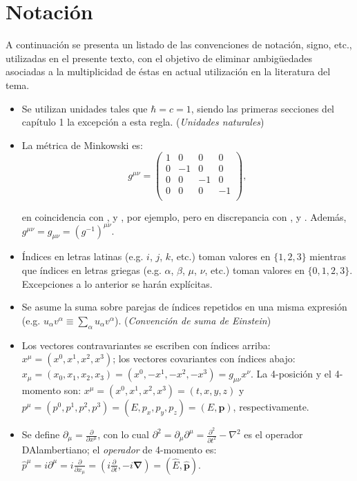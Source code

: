 \chapter*{Notación}
\label{chap:NOT}

\small{
\noindent A continuación se presenta un listado de las convenciones de notación, signo, etc., utilizadas en el presente texto, con el objetivo de eliminar ambigüedades asociadas a la multiplicidad de éstas en actual utilización en la literatura del tema. 
\begin{itemize}

	\item Se utilizan unidades tales que $\hbar=c=1$, siendo las primeras secciones del capítulo 1 la excepción a esta regla. (\textit{Unidades naturales})

	\item La métrica de Minkowski es:
	\begin{equation*} 
		g^{\mu\nu}=	\begin{pmatrix}
					1 & 0 & 0 & 0 \\
					0 & -1 & 0 & 0 \\
					0 & 0 & -1 & 0 \\
					0 & 0 & 0 & -1 \\
					\end{pmatrix},
	\end{equation*}
	
	\noindent en coincidencia con \citep{Itzykson}, \citep{Bjorken} y \citep{GreinerRQM}, por ejemplo, pero en discrepancia con \citep{Lurie}, \citep{RobinsonSymmetry} y \citep{WeinbergQTF}. Además, $g^{\mu \nu}=g_{\mu \nu}=(g^{-1})^{\mu \nu}$.
	
	\item Índices en letras latinas (e.g. $i$, $j$, $k$, etc.) toman valores en $\{1,2,3\}$ mientras que índices en letras griegas (e.g. $\alpha$, $\beta$, $\mu$, $\nu$, etc.) toman valores en $\{0,1,2,3\}$. Excepciones a lo anterior se harán explícitas.

	\item Se asume la suma sobre parejas de índices repetidos en una misma expresión (e.g. $u_\alpha v^{\alpha} \equiv \sum_\alpha u_\alpha v^{\alpha} $). (\textit{Convención de suma de Einstein})
	
	\item Los vectores contravariantes se escriben con índices arriba: $x^{\mu}=(x^0,x^1,x^2,x^3)$; los vectores covariantes con índices abajo: $x_{\mu}=(x_0,x_1,x_2,x_3)=(x^0,-x^1,-x^2,-x^3)=g_{\mu \nu}x^{\nu}$. La 4-posición y el 4-momento son: $x^{\mu}=(x^0,x^1,x^2,x^3)=(t,x,y,z)$ y $p^{\mu}=(p^0,p^1,p^2,p^3)=(E,p_x,p_y,p_z)=(E,\mathbf{p})$, respectivamente. 
	
	\item Se define $\partial_\mu=\frac{\partial}{\partial x^{\mu}}$, con lo cual $\partial^2=\partial_\mu \partial^{\mu}= \frac{\partial^2}{\partial t^2}-\nabla^2$ es el operador D\textquotesingle Alambertiano; el \textit{operador} de 4-momento es: $\hat{p}^\mu= i\partial^\mu=i\frac{\partial}{\partial x_\mu}=(i\frac{\partial}{\partial t},-i\mathbf{\nabla})=(\hat{E},\mathbf{\hat{p}})$.
	
\end{itemize}
}